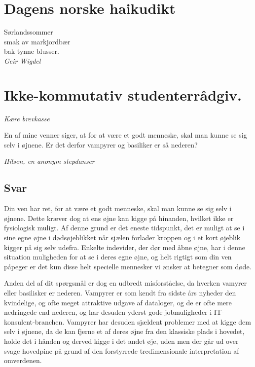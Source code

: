 

\begin{minipage}[b]{0.95\linewidth}
\begin{minipage}[t]{0.47\textwidth}
\vspace{1mm}
\section*{Dagens norske haikudikt}
\begin{center}
Sørlandssommer \\
smak av markjordbær \\
bak tynne blusser. \\
\emph{Geir Wigdel}
\end{center}
 

\section*{Ikke-kommutativ studenterrådgiv.}
\emph{Kære brevkasse}

En af mine venner siger, at for at være et godt menneske, skal man kunne se sig selv i øjnene. Er det derfor vampyrer og basiliker er så nederen?

\emph{Hilsen, en anonym stepdanser}

\subsection*{Svar}

Din ven har ret, for at være et godt menneske, skal man kunne se sig selv i øjnene. Dette kræver dog at ens øjne kan kigge på hinanden, hvilket ikke er fysiologisk muligt. Af denne grund er det eneste tidspunkt, det er muligt at se i sine egne øjne i dødsøjeblikket når sjælen forlader kroppen og i et kort øjeblik kigger på sig selv udefra. Enkelte indevider, der dør med åbne øjne, har i denne situation muligheden for at se i deres egne øjne, og helt rigtigt som din ven påpeger er det kun disse helt specielle mennesker vi ønsker at betegner som døde. 

Anden del af dit spørgsmål er dog en udbredt misforståelse, da hverken vamyrer eller basilisker er nederen. Vampyrer er som kendt fra sidste års nyheder den kvindelige, og ofte meget attraktive udgave af dataloger, og de er ofte mere nedringede end nederen, og har desuden yderst gode jobmuligheder i IT-konsulent-branchen. Vampyrer har desuden sjældent problemer med at kigge dem selv i øjnene, da de kan fjerne et af deres øjne fra den klassiske plads i hovedet, holde det i hånden og derved kigge i det andet øje, uden men der går ud over svage hovedpine på grund af den forstyrrede tredimensionale interpretation af omverdenen.


\end{minipage}
\end{minipage}
